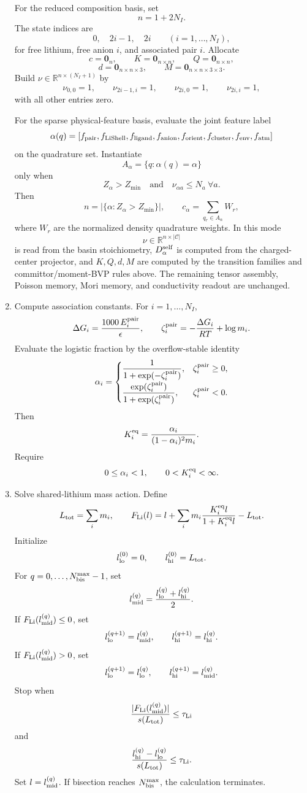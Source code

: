 \documentclass[10pt]{article}
\newcommand{\R}{\mathbb{R}}
\newcommand{\zero}{\mathbf{0}}
\begin{document}
\begin{multicols}{2}
\begin{enumerate}[label=\textbf{A\arabic*.}]
For the reduced composition basis, set
\[
n=1+2N_I.
\]
The state indices are
\[
0,\quad 2i-1,\quad 2i
\qquad(i=1,\ldots,N_I),
\]
for free lithium, free anion \(i\), and associated pair \(i\). Allocate
\[
c=\zero_n,
\qquad
K=\zero_{n\times n},
\qquad
Q=\zero_{n\times n},
\]
\[
d=\zero_{n\times n\times3},
\qquad
M=\zero_{n\times n\times3\times3}.
\]
Build \(\nu\in\R^{n\times(N_I+1)}\) by
\[
\nu_{0,0}=1,\qquad
\nu_{2i-1,i}=1,\qquad
\nu_{2i,0}=1,\qquad
\nu_{2i,i}=1,
\]
with all other entries zero.

For the sparse physical-feature basis, evaluate the joint feature label
\[
\alpha(q)=
\left[
f_{\rm pair},f_{\rm LiShell},f_{\rm ligand},f_{\rm anion},
f_{\rm orient},f_{\rm cluster},f_{\rm env},f_{\rm atm}
\right]
\]
on the quadrature set. Instantiate
\[
A_\alpha=\{q:\alpha(q)=\alpha\}
\]
only when
\[
Z_\alpha>Z_{\min}
\quad\text{and}\quad
\nu_{\alpha a}\le N_a\ \forall a.
\]
Then
\[
n=|\{\alpha:Z_\alpha>Z_{\min}\}|,
\qquad
c_\alpha=
\sum_{q_{r}\in A_\alpha}W_r,
\]
where \(W_r\) are the normalized density quadrature weights. In this mode
\[
\nu\in\R^{n\times |\mathcal C|}
\]
is read from the basin stoichiometry, \(D_\alpha^{\rm self}\) is computed from
the charged-center projector, and \(K,Q,d,M\) are computed by the transition
families and committor/moment-BVP rules above. The remaining tensor assembly,
Poisson memory, Mori memory, and conductivity readout are unchanged.

\item Compute association constants. For \(i=1,\ldots,N_I\),
\[
\Delta G_i=\frac{1000\,E_i^{\rm pair}}{\epsilon},
\qquad
\zeta_i^{\rm pair}
=
-\frac{\Delta G_i}{RT}+\log m_i.
\]
Evaluate the logistic fraction by the overflow-stable identity
\[
\alpha_i=
\begin{cases}
\dfrac{1}{1+\exp(-\zeta_i^{\rm pair})},
& \zeta_i^{\rm pair}\ge0,\\[8pt]
\dfrac{\exp(\zeta_i^{\rm pair})}
{1+\exp(\zeta_i^{\rm pair})},
& \zeta_i^{\rm pair}<0.
\end{cases}
\]
Then
\[
K_i^{\rm eq}
=
\frac{\alpha_i}{(1-\alpha_i)^2m_i}.
\]
Require
\[
0\le\alpha_i<1,
\qquad
0<K_i^{\rm eq}<\infty.
\]

\item Solve shared-lithium mass action. Define
\[
L_{\rm tot}=\sum_i m_i,
\qquad
F_{\rm Li}(l)
=
l+\sum_i m_i
\frac{K_i^{\rm eq}l}{1+K_i^{\rm eq}l}
-L_{\rm tot}.
\]
Initialize
\[
l_{\rm lo}^{(0)}=0,
\qquad
l_{\rm hi}^{(0)}=L_{\rm tot}.
\]
For \(q=0,\ldots,N_{\rm bis}^{\max}-1\), set
\[
l_{\rm mid}^{(q)}
=
\frac{l_{\rm lo}^{(q)}+l_{\rm hi}^{(q)}}{2}.
\]
If \(F_{\rm Li}(l_{\rm mid}^{(q)})\le0\), set
\[
l_{\rm lo}^{(q+1)}=l_{\rm mid}^{(q)},
\qquad
l_{\rm hi}^{(q+1)}=l_{\rm hi}^{(q)}.
\]
If \(F_{\rm Li}(l_{\rm mid}^{(q)})>0\), set
\[
l_{\rm lo}^{(q+1)}=l_{\rm lo}^{(q)},
\qquad
l_{\rm hi}^{(q+1)}=l_{\rm mid}^{(q)}.
\]
Stop when
\[
\frac{|F_{\rm Li}(l_{\rm mid}^{(q)})|}{s(L_{\rm tot})}
\le\tau_{\rm Li}
\]
and
\[
\frac{l_{\rm hi}^{(q)}-l_{\rm lo}^{(q)}}{s(L_{\rm tot})}
\le\tau_{\rm Li}.
\]
Set \(l=l_{\rm mid}^{(q)}\). If bisection reaches
\(N_{\rm bis}^{\max}\), the calculation terminates.


\end{enumerate}
\end{multicols}
\end{document}
